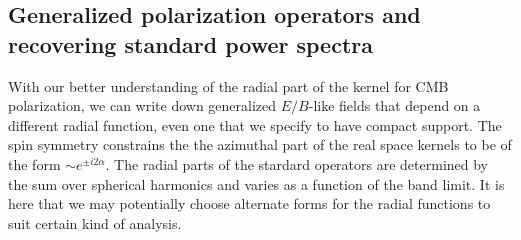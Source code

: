 \subsection{Generalized polarization operators and recovering standard power spectra}\label{sec:generalized_operators}  
With our better understanding of the radial part of the kernel for CMB polarization, we can write down generalized $E/B$-like fields that depend on a different radial function, even one that we specify to have compact support.
The spin symmetry constrains the the azimuthal part of the real space kernels to be of the form $\sim e^{\pm i2 \alpha}$.  The radial parts of the stardard operators are determined by the sum over spherical harmonics and varies as a function of the band limit. It is here that we may potentially choose alternate forms for the radial functions to suit certain kind of analysis.

